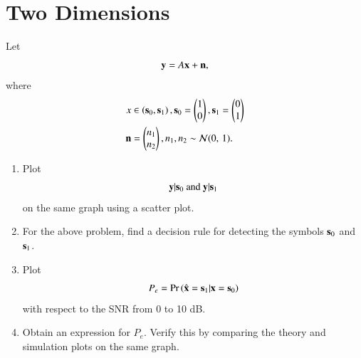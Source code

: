 \documentclass[journal,12pt,twocolumn]{IEEEtran}
\renewcommand\thesection{\arabic{section}}
\begin{document}
\section{Two Dimensions}
Let 
\begin{equation}
\mathbf{y} = A\mathbf{x} + \mathbf{n},
\end{equation}
where 
\begin{align}
x &\in \left(\mathbf{s}_0,\mathbf{s}_1\right), 
\mathbf{s}_0 = 
\begin{pmatrix}
1 
\\
0
\end{pmatrix},
\mathbf{s}_1 = 
\begin{pmatrix}
0 
\\
1
\end{pmatrix}
\\
\mathbf{n} &= 
\begin{pmatrix}
n_1
\\
n_2
\end{pmatrix},
n_1,n_2 \sim \mathcal{N}(0,\,1).
\end{align}
%

\begin{enumerate}[label=\thesection.\arabic*
,ref=\thesection.\theenumi]

\item
	\label{ch5_fsk}
	Plot 
	\begin{equation}
	\mathbf{y}|\mathbf{s}_0 \text{ and } \mathbf{y}|\mathbf{s}_1
	\end{equation}
	on the same graph using a scatter plot.
	
\item
	For the above problem, find a decision rule for detecting the symbols $\mathbf{s}_0 $ and $\mathbf{s}_1$.
	
\item
	Plot 
	\begin{equation} 
	P_e = \Pr\left(\hat{\mathbf{x}} = \mathbf{s}_1|\mathbf{x} = \mathbf{s}_0\right)
	\end{equation}
	with respect to the SNR from 0 to 10 dB.
	
\item
	Obtain an expression for $P_e$. Verify this by comparing the theory and simulation plots on the same graph.

\end{enumerate}
\end{document}
